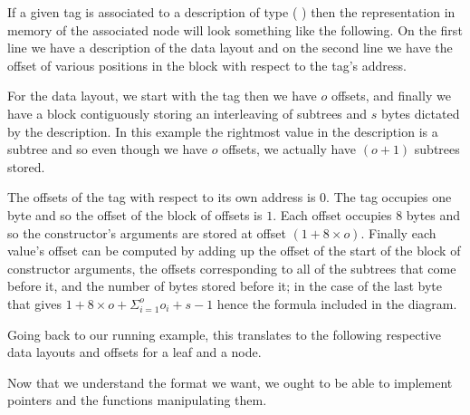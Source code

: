 If a given tag is associated to a description of type
(   )
then the representation in memory of the associated node will look something
like the following.
%
On the first line we have a description of the data layout and on the
second line we have the offset of various positions in the block with
respect to the tag's address.

\label{fig:data-layout}
\begin{center}

\end{center}


For the data layout,
we start with the tag
then we have $o$ offsets,
and finally we have a block contiguously storing an interleaving of
subtrees and $s$ bytes
dictated by the description.
%
In this example the rightmost value in the description is a subtree and
so even though we have $o$ offsets, we actually have $(o+1)$ subtrees stored.

The offsets of the tag with respect to its own address is $0$.
The tag occupies one byte and so the offset of the block of offsets is $1$.
Each offset occupies 8 bytes and so the constructor's arguments
are stored at offset $(1+8\times{}o)$.
Finally each value's offset can be computed by adding up
the offset of the start of the block of constructor arguments,
the offsets corresponding to all of the subtrees that come before it,
and the number of bytes stored before it;
in the case of the last byte that gives $1+8\times{}o + \Sigma_{i=1}^{o}o_i + s-1$
hence the formula included in the diagram.

Going back to our running example, this translates to the following
respective data layouts and offsets for a leaf and a node.

\begin{center}
  
\end{center}

Now that we understand the format we want, we ought to be able to implement pointers
and the functions manipulating them.
